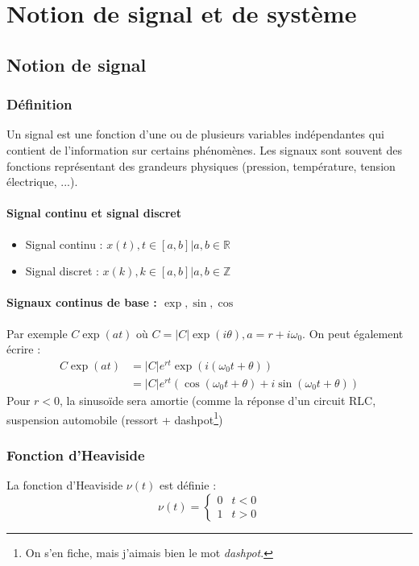\chapter{Notion de signal et de système}
\section{Notion de signal}
	\subsection{Définition}
	Un signal est une fonction d’une ou de plusieurs variables indépendantes 
	qui contient de l’information sur certains phénomènes. Les signaux sont 
	souvent des fonctions représentant des grandeurs physiques (pression, 
	température, tension électrique, ...).
	
		\subsubsection{Signal continu et signal discret}
		\begin{itemize}
		\item Signal continu : $x(t), t \in [a,b] | a,b\in\mathbb{R}$
		\item Signal discret : $x(k), k \in [a,b] | a,b\in\mathbb{Z}$
		\end{itemize}
	
		\subsubsection{Signaux continus de base : $\exp,\sin,\cos$}
		Par exemple $C\exp(at)$ où $C = |C|\exp(i\theta), a = r+i\omega_0$. 
		On peut également écrire :
		\begin{equation}
		\begin{array}{ll}
		C\exp(at) &= |C|e^{rt}\exp(i(\omega_0t+\theta))\\
		 &= |C|e^{rt}(\cos(\omega_0t+\theta) + i\sin(\omega_0t+\theta))
		\end{array}
		\end{equation}
		Pour $r<0$, la sinusoïde sera amortie (comme la réponse d'un circuit
		RLC, suspension automobile (ressort + dashpot\footnote{On s'en fiche, 
		mais j'aimais bien le mot \textit{dashpot}.})
		
	\subsection{Fonction d'Heaviside}
	La fonction d'Heaviside $\nu(t)$ est définie :
	\begin{equation}
	\nu(t) = \left\{\begin{array}{ll}
	0 & t<0\\
	1 & t>0	
	\end{array}\right.
	\label{eq:Heaviside}
	\end{equation}
	
